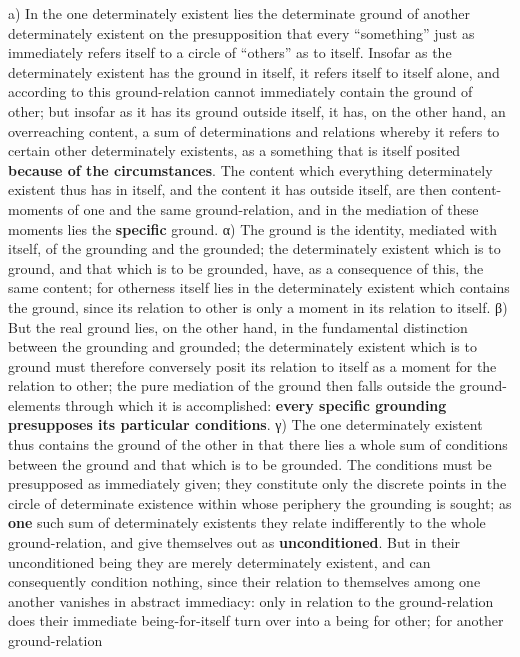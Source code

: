 \documentclass[12pt,a4paper,openany]{book}
\newcommand{\opage}[1]{\marginnote{\footnotesize\textit{[#1]}}}
\begin{document}
a) In the one determinately existent lies the determinate ground
of another determinately existent on the presupposition
that every ``something'' just as immediately refers
itself to a circle of ``others'' as to itself.
Insofar as the determinately existent has the ground in itself, it refers
itself to itself alone, and according to
this ground-relation cannot immediately contain
the ground of other; but insofar as it has its
ground outside itself, it has, on the other hand, an overreaching
content, a sum of determinations and
relations whereby it refers to certain other
determinately existents, as a something that is itself posited \textbf{because
of the circumstances}. The content which
everything determinately existent thus has in itself, and the content
it has outside itself, are then content-moments
of one and the same ground-relation, and in the mediation
of these moments lies the \textbf{specific}
ground. α) The ground is the identity, mediated with itself,
of the grounding and the grounded; the
determinately existent which is to ground, and that which is to
be grounded, have, as a consequence of this, the same content;
for otherness itself lies in the determinately existent
which contains the ground, since its relation to
other is only a moment in its relation to
itself. β) But the real ground lies, on the
other hand, in the fundamental distinction between the
grounding and grounded; the determinately existent which
is to ground must therefore conversely posit its relation
to itself as a moment for the relation
to other; the pure mediation of the ground then falls
outside the ground-elements through which it
is accomplished: \textbf{every specific grounding}
\setcounter{footnote}{0}%
\opage{137}\textbf{presupposes its particular conditions}. γ) The one determinately existent thus contains the ground of the
other in that there lies a whole sum of
conditions between the ground and that which is to be grounded.
The conditions must be presupposed as immediately
given; they constitute only the discrete points
in the circle of determinate existence within whose periphery
the grounding is sought; as \textbf{one} such sum of
determinately existents they relate indifferently to the whole
ground-relation, and give themselves out as \textbf{unconditioned}. But
in their unconditioned being they are merely determinately existent,
and can consequently condition nothing, since their relation
to themselves among one another vanishes in abstract
immediacy: only in relation to the ground-relation
does their immediate being-for-itself turn over
into a being for other; for another ground-relation
\end{document}
